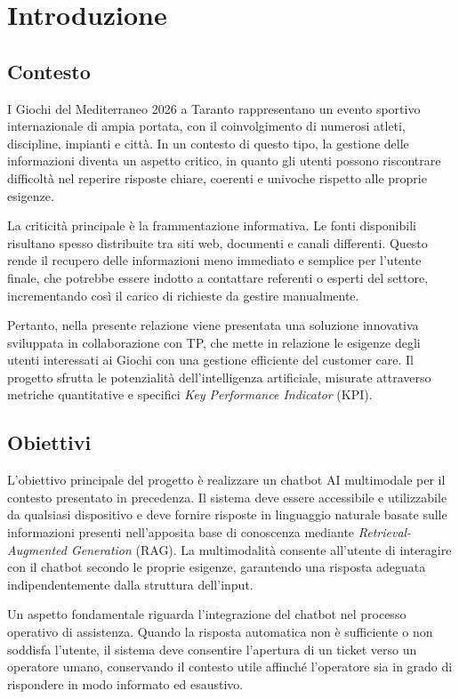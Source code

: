 \chapter{Introduzione}

\section{Contesto}

I Giochi del Mediterraneo 2026 a Taranto rappresentano un evento sportivo internazionale di ampia portata, con il coinvolgimento di numerosi atleti, discipline, impianti e città. In un contesto di questo tipo, la gestione delle informazioni diventa un aspetto critico, in quanto gli utenti possono riscontrare difficoltà nel reperire risposte chiare, coerenti e univoche rispetto alle proprie esigenze.

La criticità principale è la frammentazione informativa. Le fonti disponibili risultano spesso distribuite tra siti web, documenti e canali differenti. Questo rende il recupero delle informazioni meno immediato e semplice per l’utente finale, che potrebbe essere indotto a contattare referenti o esperti del settore, incrementando così il carico di richieste da gestire manualmente.

Pertanto, nella presente relazione viene presentata una soluzione innovativa sviluppata in collaborazione con TP, che mette in relazione le esigenze degli utenti interessati ai Giochi con una gestione efficiente del customer care. Il progetto sfrutta le potenzialità dell’intelligenza artificiale, misurate attraverso metriche quantitative e specifici \textit{Key Performance Indicator} (KPI).

\section{Obiettivi}

L’obiettivo principale del progetto è realizzare un chatbot AI multimodale per il contesto presentato in precedenza. Il sistema deve essere accessibile e utilizzabile da qualsiasi dispositivo e deve fornire risposte in linguaggio naturale basate sulle informazioni presenti nell’apposita base di conoscenza mediante \textit{Retrieval-Augmented Generation} (RAG). La multimodalità consente all'utente di interagire con il chatbot secondo le proprie esigenze, garantendo una risposta adeguata indipendentemente dalla struttura dell'input.

Un aspetto fondamentale riguarda l’integrazione del chatbot nel processo operativo di assistenza. Quando la risposta automatica non è sufficiente o non soddisfa l’utente, il sistema deve consentire l’apertura di un ticket verso un operatore umano, conservando il contesto utile affinché l'operatore sia in grado di rispondere in modo informato ed esaustivo.

